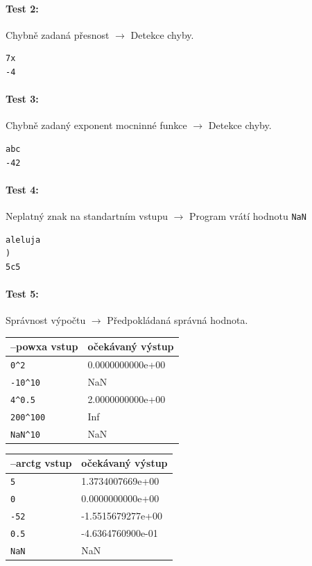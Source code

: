 \documentclass[12pt,a4paper,titlepage,final]{article}
\begin{document}
\paragraph{Test 2:} Chybně zadaná přesnost $\longrightarrow$ Detekce chyby.
\begin{verbatim}
7x
-4
\end{verbatim} 

\paragraph{Test 3:} Chybně zadaný exponent mocninné funkce $\longrightarrow$ Detekce
chyby.
\begin{verbatim}
abc
-42
\end{verbatim} 

\paragraph{Test 4:} Neplatný znak na standartním vstupu $\longrightarrow$ Program vrátí hodnotu \texttt{NaN}
\begin{verbatim}
aleluja
)
5c5
\end{verbatim} 

\paragraph{Test 5:} Správnost výpočtu $\longrightarrow$ Předpokládaná správná
hodnota.

\vspace{1em}\begin{tabular}{ll} %
 --powxa
vstup & očekávaný výstup \\
\hline
\verb|0^2| & 0.0000000000e+00 \\
\verb|-10^10| &  NaN\\
\verb|4^0.5| & 2.0000000000e+00 \\
\verb|200^100| & Inf \\
\verb|NaN^10| & NaN \\
\end{tabular}

\vspace{1em}\begin{tabular}{ll} %
--arctg
vstup & očekávaný výstup \\
\hline
\verb|5| & 1.3734007669e+00 \\
\verb|0| & 0.0000000000e+00 \\
\verb|-52| & -1.5515679277e+00 \\
\verb|0.5| & -4.6364760900e-01 \\
\verb|NaN| & NaN \\

\end{tabular}
\end{document}
